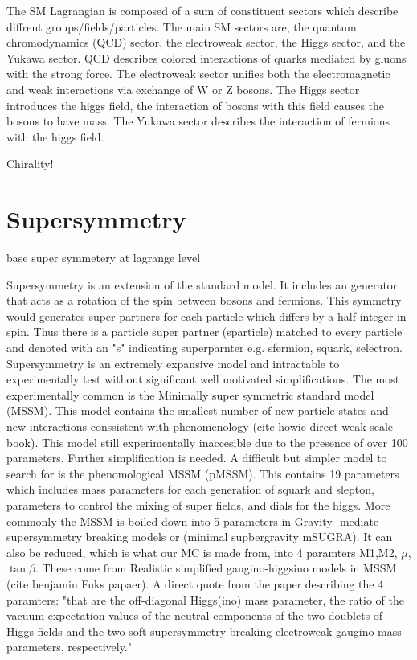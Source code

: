 

The SM Lagrangian is composed of a sum of constituent sectors which describe diffrent groups/fields/particles. The main SM sectors are, the quantum chromodynamics (QCD) sector, the electroweak sector, the Higgs sector, and the Yukawa sector. QCD describes colored interactions of quarks mediated by gluons with the strong force. The electroweak sector unifies both the electromagnetic and weak interactions via exchange of W or Z bosons. The Higgs sector introduces the higgs field, the interaction of bosons with this field causes the bosons to have mass. The Yukawa sector describes the interaction of fermions with the higgs field.


Chirality!


\section{Supersymmetry}

base super symmetery at lagrange level

Supersymmetry is an extension of the standard model. It includes an generator that acts as a rotation of the spin between bosons and fermions. This symmetry would generates super partners for each particle which differs by a half integer in spin. Thus there is a particle super partner (sparticle) matched to every particle and denoted with an "s" indicating superparnter e.g. sfermion, squark, selectron. Supersymmetry is an extremely expansive model and intractable to experimentally test without significant well motivated simplifications. The most experimentally common is the Minimally super symmetric standard model (MSSM). This model contains the smallest number of new particle states and new interactions conssistent with phenomenology (cite howie direct weak scale book). This model still experimentally inaccesible due to the presence of over 100 parameters. Further simplification is needed. A difficult but simpler model to search for is the phenomological MSSM (pMSSM). This contains 19 parameters which includes mass parameters for each generation of squark and slepton, parameters to control the mixing of super fields, and dials for the higgs.  More commonly the MSSM is boiled down into 5 parameters in Gravity -mediate supersymmetry breaking models or (minimal supbergravity mSUGRA). It can also be reduced, which is what our MC is made from, into 4 paramters M1,M2, $\mu$, $\tan\beta$. These come from Realistic simplified gaugino-higgsino models in MSSM (cite benjamin Fuks papaer). A direct quote from the paper describing the 4 paramters: "that are the off-diagonal Higgs(ino) mass parameter, the ratio of the vacuum expectation values of the neutral components of the two doublets of Higgs fields and the two soft
supersymmetry-breaking electroweak gaugino mass parameters, respectively."

